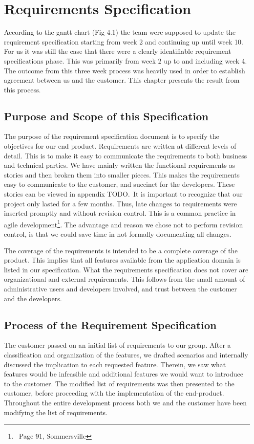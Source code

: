 \section{Requirements Specification}
According to the gantt chart (Fig 4.1) the team were supposed to update the
requirement specification starting from week 2 and continuing up until week
10. For us it was still the case that there were a clearly identifiable
requirement specifications phase. This was primarily from week 2 up to and
including week 4. The outcome from this three week process was heavily used in
order to establish agreement between us and the customer. This chapter
presents the result from this process. 

\subsection{Purpose and Scope of this Specification}
The purpose of the requirement specification document is to specify the
objectives for our end product. Requirements are written at different
levels of detail. This is to make it easy to communicate the requirements to
both business and technical parties. We have mainly written the functional
requirements as stories and then broken them into smaller pieces. This makes
the requirements easy to communicate to the customer, and succinct for the
developers. These stories can be viewed in appendix TODO.\ It is important to
recognize that our project only lasted for a few months. Thus, late changes
to requirements were inserted promptly and without revision control. This is
a common practice in agile development\footnote{\ Page 91, Sommersville}.
The advantage and reason we chose not to perform revision control, is that we
could save time in not formally documenting all changes.

The coverage of the requirements is intended to be a complete coverage
of the product. This implies that all features available from the
application domain is listed in our specification. What the requirements
specification does not cover are organizational and external requirements. This
follows from the small amount of administrative users and developers involved,
and trust between the customer and the developers.

\subsection{Process of the Requirement Specification}
The customer passed on an initial list of requirements to our group. After a
classification and organization of the features, we drafted scenarios and
internally discussed the implication to each requested feature. Therein, we saw
what features would be infeasible and additional features we would want to
introduce to the customer. The modified list of requirements was then presented
to the customer, before proceeding with the implementation of the end-product.
Throughout the entire development process both we and the customer have been
modifying the list of requirements.

